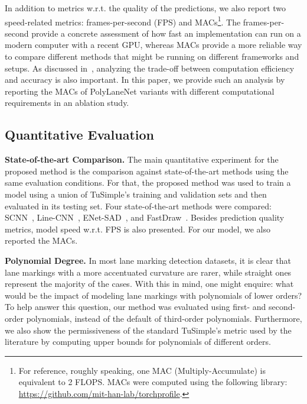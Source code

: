 \documentclass[a4paper,conference]{IEEEtran}
\begin{document}
In addition to metrics w.r.t. the quality of the predictions, we also report two speed-related metrics: frames-per-second (FPS) and MACs\footnote{For reference, roughly speaking, one MAC (Multiply-Accumulate) is equivalent to 2 FLOPS. MACs were computed using the following library: \url{https://github.com/mit-han-lab/torchprofile}.}. The frames-per-second provide a concrete assessment of how fast an implementation can run on a modern computer with a recent GPU, whereas MACs provide a more reliable way to compare different methods that might be running on different frameworks and setups. As discussed in~\cite{satzoda2014icpr}, analyzing the trade-off between computation efficiency and accuracy is also important. In this paper, we provide such an analysis by reporting the MACs of PolyLaneNet variants with different computational requirements in an ablation study.



\subsection{Quantitative Evaluation}

\textbf{State-of-the-art Comparison.}
The main quantitative experiment for the proposed method is the comparison against state-of-the-art methods using the same evaluation conditions. For that, the proposed method was used to train a model using a union of TuSimple's training and validation sets and then evaluated in its testing set. Four state-of-the-art methods were compared: SCNN~\cite{scnn2018aaai}, Line-CNN~\cite{linecnn2019tits}, ENet-SAD~\cite{enetsad2019iccv}, and FastDraw~\cite{fastdraw2019cvpr}. Besides prediction quality metrics, model speed w.r.t. FPS is also presented. For our model, we also reported the MACs.

\textbf{Polynomial Degree.}
In most lane marking detection datasets, it is clear that lane markings with a more accentuated curvature are rarer, while straight ones represent the majority of the cases. With this in mind, one might enquire: what would be the impact of modeling lane markings with polynomials of lower orders? To help answer this question, our method was evaluated using first- and second-order polynomials, instead of the default of third-order polynomials. Furthermore, we also show the permissiveness of the standard TuSimple's metric used by the literature by computing upper bounds for polynomials of different orders.
\end{document}

